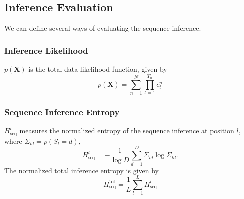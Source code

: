 \documentclass[10pt]{article}
\begin{document}
\subsection{Inference Evaluation}
We can define several ways of evaluating the sequence inference.
\subsubsection{Inference Likelihood}
$p(\mathbf{X})$ is the total data likelihood function, given by
\begin{equation}
p(\mathbf{X}) = \displaystyle\sum_{n=1}^N\displaystyle\prod_{t=1}^{T_n} c_{t}^n
\end{equation}
\subsubsection{Sequence Inference Entropy}
$H_\mathrm{seq}^l$ measures the normalized entropy of the sequence inference at position $l$, where $\Sigma_{ld} = p(S_l = d)$,
\begin{equation}
H_\mathrm{seq}^l = -\frac{1}{\log{D}}\displaystyle\sum_{d=1}^{D} \Sigma_{ld}\log{\Sigma_{ld}}.
\end{equation}
The normalized total inference entropy is given by
\begin{equation}
H_{\mathrm{seq}}^{\mathrm{tot}} = \frac{1}{L}\displaystyle\sum_{l=1}^{L} H_\mathrm{seq}^l
\end{equation}
\end{document}
